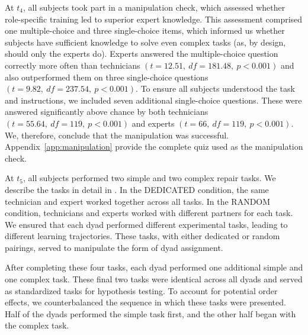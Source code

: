 \documentclass[msom,nonblindrev]{01 latex/class/informs3}
\begin{document}
At $t_4$, all subjects took part in a manipulation check, which assessed whether role-specific training led to superior expert knowledge. This assessment comprised one multiple-choice and three single-choice items, which informed us whether subjects have sufficient knowledge to solve even complex tasks (as, by design, should only the experts do). Experts answered the multiple-choice question correctly more often than technicians $(t = 12.51,\ df = 181.48,\ p < 0.001)$ and also outperformed them on three single-choice questions $(t = 9.82,\ df = 237.54,\ p < 0.001)$. To ensure all subjects understood the task and instructions, we included seven additional single-choice questions. These were answered significantly above chance by both technicians $(t = 55.64,\ df = 119,\ p < 0.001)$ and experts $(t = 66,\ df = 119,\ p < 0.001)$. We, therefore, conclude that the manipulation was successful. Appendix~\ref{app:manipulation} provide the complete quiz used as the manipulation check.

At $t_5$, all subjects performed two simple and two complex repair tasks. We describe the tasks in detail in . In the DEDICATED condition, the same technician and expert worked together across all tasks. In the RANDOM condition, technicians and experts worked with different partners for each task. We ensured that each dyad performed different experimental tasks, leading to different learning trajectories. These tasks, with either dedicated or random pairings, served to manipulate the form of dyad assignment.

After completing these four tasks, each dyad performed one additional simple and one complex task. These final two tasks were identical across all dyads and served as standardized tasks for hypothesis testing. To account for potential order effects, we counterbalanced the sequence in which these tasks were presented. Half of the dyads performed the simple task first, and the other half began with the complex task.

\end{document}
